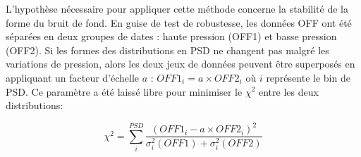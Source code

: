 L'hypothèse nécessaire pour appliquer cette méthode concerne la stabilité de la forme du bruit de fond. En guise de test de robustesse, les données OFF ont été séparées en deux groupes de dates : haute pression (OFF1) et basse pression (OFF2). Si les formes des distributions en PSD ne changent pas malgré les variations de pression, alors les deux jeux de données peuvent être superposés en appliquant un facteur d'échelle $a$ : $OFF1_i = a \times OFF2_i$ où $i$ représente le bin de PSD. Ce paramètre a été laissé libre pour minimiser le $\chi^2$ entre les deux distributions:

\begin{equation}
    \chi^2 = \sum_i^{PSD} \frac{\left(OFF1_i - a \times OFF2_i\right)^2}{\sigma^2_i(OFF1) + \sigma^2_i(OFF2)}
\end{equation}

